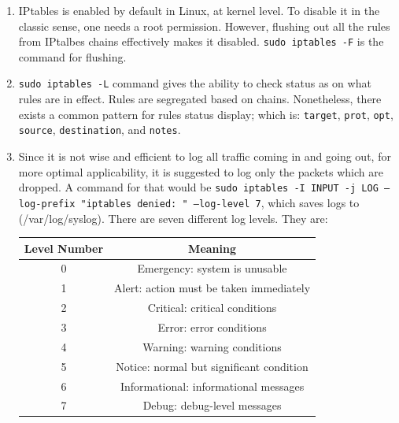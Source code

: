 \documentclass[12pt]{extarticle}
\begin{document}
\begin{enumerate}

\item IPtables is enabled by default in Linux, at kernel level. To disable it in the classic sense, one needs a root permission. However, flushing out all the rules from IPtalbes chains effectively makes it disabled. \texttt{sudo iptables -F} is the command for flushing.

\item \texttt{sudo iptables -L} command gives the ability to check status as on what rules are in effect. Rules are segregated based on chains. Nonetheless, there exists a common pattern for rules status display; which is: \texttt{target}, \texttt{prot}, \texttt{opt}, \texttt{source}, \texttt{destination}, and \texttt{notes}. 

\item Since it is not wise and efficient to log all traffic coming in and going out, for more optimal applicability, it is suggested to log only the packets which are dropped. A command for that would be \texttt{sudo iptables -I INPUT -j LOG --log-prefix "iptables denied: " --log-level 7}, which saves logs to (/var/log/syslog). There are seven different log levels. They are:

\begin{center}
\begin{tabular}{ |c|c| } 
 \hline
Level Number  &  Meaning \\
 \hline
0  &     Emergency: system is unusable \\

1  &     Alert: action must be taken immediately \\

2  &     Critical: critical conditions \\

3  &     Error: error conditions \\

4  &     Warning: warning conditions \\

5  &     Notice: normal but significant condition \\

6  &     Informational: informational messages \\

7  &     Debug: debug-level messages \\
 \hline
\end{tabular}
\end{center}
\end{enumerate}
\end{document}
